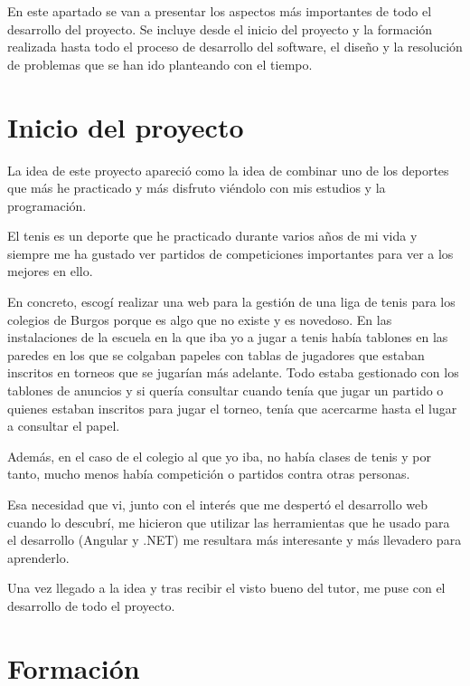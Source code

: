 
En este apartado se van a presentar los aspectos más importantes de todo el desarrollo del proyecto. Se incluye desde el inicio del proyecto y la formación realizada hasta todo el proceso de desarrollo del software, el diseño y la resolución de problemas que se han ido planteando con el tiempo.

\section{Inicio del proyecto}\label{inicio-del-proyecto}

La idea de este proyecto apareció como la idea de combinar uno de los deportes que más he practicado y más disfruto viéndolo con mis estudios y la programación.

El tenis es un deporte que he practicado durante varios años de mi vida y siempre me ha gustado ver partidos de competiciones importantes para ver a los mejores en ello.

En concreto, escogí realizar una web para la gestión de una liga de tenis para los colegios de Burgos porque es algo que no existe y es novedoso. En las instalaciones de la escuela en la que iba yo a jugar a tenis había tablones en las paredes en los que se colgaban papeles con tablas de jugadores que estaban inscritos en torneos que se jugarían más adelante. Todo estaba gestionado con los tablones de anuncios y si quería consultar cuando tenía que jugar un partido o quienes estaban inscritos para jugar el torneo, tenía que acercarme hasta el lugar a consultar el papel.

Además, en el caso de el colegio al que yo iba, no había clases de tenis y por tanto, mucho menos había competición o partidos contra otras personas. 

Esa necesidad que vi, junto con el interés que me despertó el desarrollo web cuando lo descubrí, me hicieron que utilizar las herramientas que he usado para el desarrollo (Angular y .NET) me resultara más interesante y más llevadero para aprenderlo.

Una vez llegado a la idea y tras recibir el visto bueno del tutor, me puse con el desarrollo de todo el proyecto.

\section{Formación}\label{formacion}

